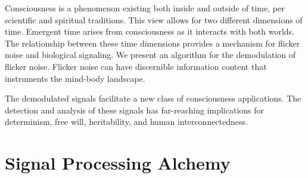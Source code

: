 \documentclass[oneside,11pt]{memoir} %
\begin{document}
Consciousness is a phenomenon existing both inside and outside of time,
per scientific and spiritual traditions.
This view allows for two different dimensions of time.
Emergent time arises from consciousness as it interacts with both worlds.
The relationship between these time dimensions provides a mechanism for flicker
noise and biological signaling.
We present an algorithm for the demodulation of flicker noise.
Flicker noise can have discernible information content that instruments the
mind-body landscape.

The demodulated signals facilitate a new class of consciousness applications.
The detection and analysis of these signals has far-reaching implications for
determinism, free will, heritability, and human interconnectedness.


\chapter{Signal Processing Alchemy}








\end{document}
